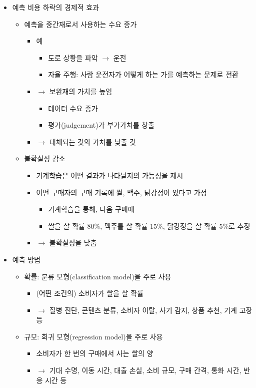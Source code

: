 \begin{itemize}
\begin{itemize}
	\end{itemize}	
\item 예측 비용 하락의 경제적 효과
	\begin{itemize}
	\item 예측을 중간재로서 사용하는 수요 증가
		\begin{itemize}
		\item 예
			\begin{itemize}
			\item 도로 상황을 파악 $\rightarrow$ 운전
			\item 자율 주행: 사람 운전자가 어떻게 하는 가를 예측하는 문제로 전환
			\end{itemize}
		\item $\rightarrow$ 보완재의 가치를 높임
			\begin{itemize}
			\item 데이터 수요 증가
			\item 평가(judgement)가 부가가치를 창출
			\end{itemize}
		\item $\rightarrow$ 대체되는 것의 가치를 낮출 것	
		\end{itemize}
	\item 불확실성 감소
		\begin{itemize}
		\item 기계학습은 어떤 결과가 나타날지의 가능성을 제시
		\item 어떤 구매자의 구매 기록에 쌀, 맥주, 닭강정이 있다고 가정
			\begin{itemize}
			\item 기계학습을 통해, 다음 구매에 
			\item 쌀을 살 확률 80\%, 맥주를 살 확률 15\%, 닭강정을 살 확률 5\%로 추정
			\end{itemize}
		\item $\rightarrow$ 불확실성을 낮춤
		\end{itemize}	
	\end{itemize}
\item 예측 방법
	\begin{itemize}
	\item 확률: 분류 모형(classification model)을 주로 사용
		\begin{itemize}
		\item (어떤 조건의) 소비자가 쌀을 살 확률
		\item $\rightarrow$ 질병 진단, 콘텐츠 분류, 소비자 이탈, 사기 감지, 상품 추천, 기계 고장 등
		\end{itemize}
	\item 규모: 회귀 모형(regression model)을 주로 사용
		\begin{itemize}
		\item 소비자가 한 번의 구매에서 사는 쌀의 양
		\item $\rightarrow$ 기대 수명, 이동 시간, 대출 손실, 소비 규모, 구매 간격, 통화 시간, 반응 시간 등
		\end{itemize}
	\end{itemize}	
\end{itemize}

